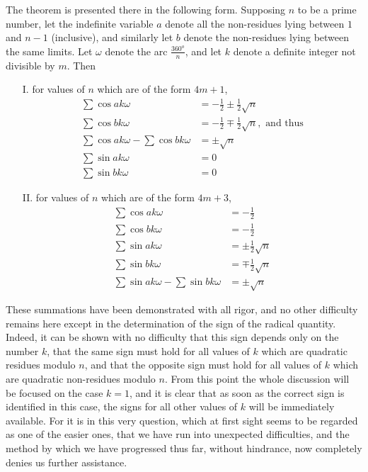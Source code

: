 \documentclass{book}
\theoremstyle{plain}
\theoremstyle{remark}
\begin{document}
The theorem is presented there in the following form.  Supposing $n$ to be a prime number, let the indefinite variable $a$ denote all the non-residues lying between $1$ and $n-1$ (inclusive), and similarly let $b$ denote the non-residues lying between the same limits.   Let $\omega$ denote the arc $\frac{360^o}{n}$, and let $k$ denote a definite integer not divisible by $m$.  Then
\begin{enumerate}
\item[I.] for values of $n$ which are of the form $4m+1$,
\begin{align*} \sum \cos a k \omega &= -\tfrac{1}{2} \pm \tfrac{1}{2} \sqrt{n} \\
\sum \cos bk\omega &= -\tfrac{1}{2}\mp \tfrac{1}{2} \sqrt{n}, \textrm{ and thus} \\
\sum \cos ak\omega - \sum \cos b k \omega &= \pm \sqrt{n} \\
\sum \sin a k\omega &= 0 \\
\sum \sin  b k \omega &= 0 \end{align*} 
\item[II.] for values of $n$ which are of the form $4m+3$,
\begin{align*} \sum \cos a k \omega &= -\tfrac{1}{2}  \\
\sum \cos bk\omega &= -\tfrac{1}{2} \\
\sum \sin a k\omega &= \pm \tfrac{1}{2} \sqrt{n} \\
\sum \sin  b k \omega &= \mp \tfrac{1}{2} \sqrt{n} \\
\sum \sin a k\omega - \sum \sin b k\omega &= \pm \sqrt{n} 
\end{align*} 
\end{enumerate} 
These summations have been demonstrated with all rigor, and no other difficulty remains here except in the determination of the sign of the radical quantity.  Indeed, it can be shown with no difficulty that this sign depends only on the number $k$, that the same sign must hold for all values of $k$ which are quadratic residues modulo $n$, and that the opposite sign must hold for all values of $k$ which are quadratic non-residues modulo $n$.  From this point the whole discussion will be focused on the case $k=1$, and it is clear that as soon as the correct sign is identified in this case, the signs for all other values of $k$ will be immediately available.   For it is in this very question, which at first sight seems to be regarded as one of the easier ones, that we have run into unexpected difficulties, and the method by which we have progressed thus far, without hindrance, now completely denies us further assistance.
\end{document}

